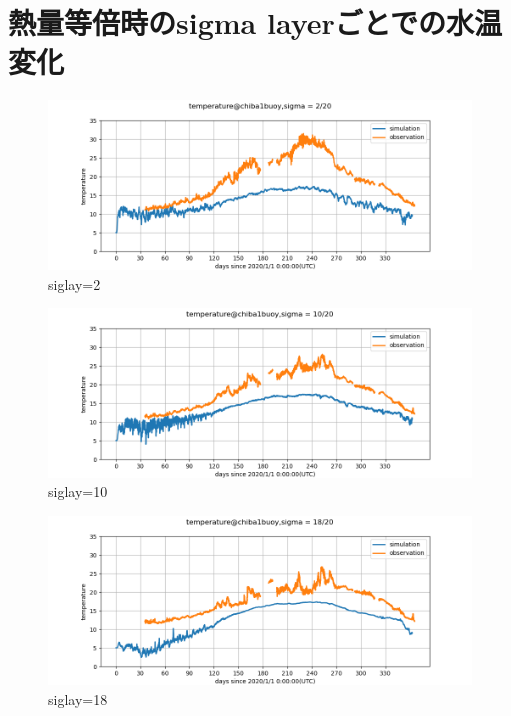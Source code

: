 \documentclass[12pt,a4paper]{jarticle}
\begin{document}
\newpage
\section{熱量等倍時のsigma layerごとでの水温変化}
\begin{figure}[hbtp]
    \centering
        \includegraphics[keepaspectratio,scale=0.5]{Tokyo4/temperature_chiba1buoy_2_Tokyo4.png}
    \caption{siglay=2}
\end{figure}

\begin{figure}[hbtp]
    \centering
        \includegraphics[keepaspectratio,scale=0.5]{Tokyo4/temperature_chiba1buoy_10_Tokyo4.png}
    \caption{siglay=10}
\end{figure}

\begin{figure}[hbtp]
    \centering
        \includegraphics[keepaspectratio,scale=0.5]{Tokyo4/temperature_chiba1buoy_18_Tokyo4.png}
    \caption{siglay=18}
\end{figure}
\end{document}
